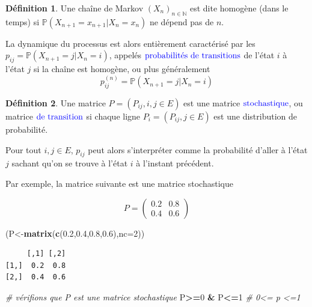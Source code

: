 \documentclass[
]{book}
\newenvironment{Shaded}{\begin{snugshade}}{\end{snugshade}}
\newcommand{\CommentTok}[1]{\textcolor[rgb]{0.56,0.35,0.01}{\textit{#1}}}
\newcommand{\DataTypeTok}[1]{\textcolor[rgb]{0.13,0.29,0.53}{#1}}
\newcommand{\DecValTok}[1]{\textcolor[rgb]{0.00,0.00,0.81}{#1}}
\newcommand{\FloatTok}[1]{\textcolor[rgb]{0.00,0.00,0.81}{#1}}
\newcommand{\KeywordTok}[1]{\textcolor[rgb]{0.13,0.29,0.53}{\textbf{#1}}}
\newcommand{\NormalTok}[1]{#1}
\newcommand{\OperatorTok}[1]{\textcolor[rgb]{0.81,0.36,0.00}{\textbf{#1}}}
\newcommand{\StringTok}[1]{\textcolor[rgb]{0.31,0.60,0.02}{#1}}
\theoremstyle{definition}
\newtheorem{definition}{Définition}[chapter]
\theoremstyle{definition}
\theoremstyle{definition}
\theoremstyle{remark}
\begin{document}
\begin{definition}
\protect\hypertarget{def:unnamed-chunk-38}{}{\label{def:unnamed-chunk-38} }Une chaîne de Markov \((X_n)_{n \in \mathbb{N}}\) est dite homogène (dans le temps) si \(\mathbb{P}(X_{n+1}=x_{n+1}|X_n=x_n)\) ne dépend pas de \(n\).
\end{definition}

La dynamique du processus est alors entièrement caractérisé par les \(p_{ij}=\mathbb{P}(X_{n+1}=j|X_n=i)\), appelés \(\color{blue}{\mathbf{\text{probabilités de transitions}}}\) de l'état \(i\) à l'état \(j\) si la chaîne est homogène, ou plus généralement
\[ p_{ij}^{(n)}=\mathbb{P}(X_{n+1}=j|X_n=i)\]
\begin{definition}
\protect\hypertarget{def:unnamed-chunk-39}{}{\label{def:unnamed-chunk-39} }Une matrice \(P=(P_{ij},i,j \in E)\) est une matrice \(\color{blue}{\mathbf{\text{stochastique}}}\), ou matrice \(\color{blue}{\mathbf{\text{de transition}}}\) si chaque ligne \(P_i=(P_{ij}, j \in E)\) est une distribution de probabilité.
\end{definition}

Pour tout \(i,j \in E\), \(p_{ij}\) peut alors s'interpréter comme la probabilité d'aller à l'état \(j\) sachant qu'on se trouve à l'état \(i\) à l'instant précédent.

Par exemple, la matrice suivante est une matrice stochastique

\[
P=\left( 
\begin{array}{cc}
0.2 & 0.8\\
0.4 & 0.6
\end{array}
\right)
\]

\begin{Shaded}
\begin{Highlighting}[]
\NormalTok{(P<-}\KeywordTok{matrix}\NormalTok{(}\KeywordTok{c}\NormalTok{(}\FloatTok{0.2}\NormalTok{,}\FloatTok{0.4}\NormalTok{,}\FloatTok{0.8}\NormalTok{,}\FloatTok{0.6}\NormalTok{),}\DataTypeTok{nc=}\DecValTok{2}\NormalTok{))}
\end{Highlighting}
\end{Shaded}

\begin{verbatim}
     [,1] [,2]
[1,]  0.2  0.8
[2,]  0.4  0.6
\end{verbatim}

\begin{Shaded}
\begin{Highlighting}[]
\CommentTok{# vérifions que P est une matrice stochastique}
\NormalTok{P}\OperatorTok{>=}\DecValTok{0} \OperatorTok{&}\StringTok{ }\NormalTok{P}\OperatorTok{<=}\DecValTok{1}  \CommentTok{# 0<= p <=1}
\end{Highlighting}
\end{Shaded}
\end{document}
